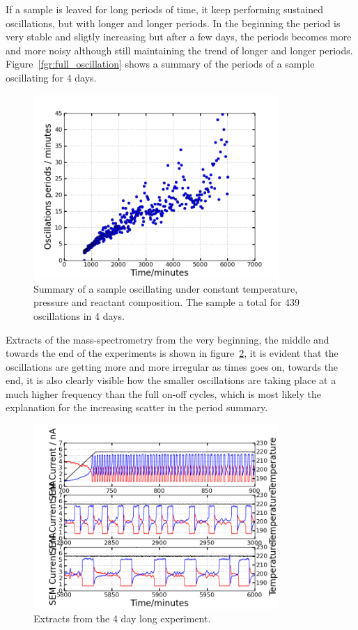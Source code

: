 \documentclass[8.5pt,twoside,twocolumn]{article}
\begin{document}
If a sample is leaved for long periods of time, it keep performing sustained oscillations, but with longer and longer periods. In the beginning the period is very stable and sligtly increasing but after a few days, the periods becomes more and more noisy although still maintaining the trend of longer and longer periods. Figure~\ref{fgr:full_oscillation} shows a summary of the periods of a sample oscillating for 4 days. 
\begin{figure}[h]
\centering
  \includegraphics[height=7cm]{summary_of_long_measurement.png}
  \caption{Summary of a sample oscillating under constant temperature, pressure and reactant composition. The sample a total for 439 oscillations in 4 days.}
  \label{fgr:long_measurement}
\end{figure}

Extracts of the mass-spectrometry from the very beginning, the middle and towards the end of the experiments is shown in figure~\ref{fgr:extracts}, it is evident that the oscillations are getting more and more irregular as times goes on, towards the end, it is also clearly visible how the smaller oscillations are taking place at a much higher frequency than the full on-off cycles, which is most likely the explanation for the increasing scatter in the period summary.
\begin{figure}
  \centering
  \includegraphics[height=7cm]{extracts_from_very_long_oscillation.png}
  \caption{Extracts from the 4 day long experiment.}
  \label{fgr:extracts}
\end{figure}
\end{document}
